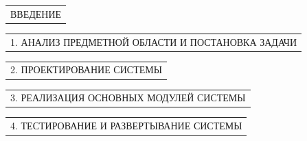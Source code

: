 \documentclass[12pt, А4, twoside]{article}
\begin{document}
\begin{FlushLeft}
    \vspace{-0.1 cm}

    \begin{tabular}{p{17.25cm}}
        \hspace{0.3cm} \textsf{ВВЕДЕНИЕ} \vspace{0pt} \hline \\
    \end{tabular}

    \vspace{-0.1 cm}

    \begin{tabular}{p{17.25cm}}
        \hspace{0.3cm} \textsf{1. АНАЛИЗ ПРЕДМЕТНОЙ ОБЛАСТИ И ПОСТАНОВКА ЗАДАЧИ} \vspace{0pt} \hline \\
    \end{tabular}



    \vspace{-0.1 cm}

    \begin{tabular}{p{17.25cm}}
        \hspace{0.3cm} \textsf{2. ПРОЕКТИРОВАНИЕ СИСТЕМЫ} \vspace{0.03cm} \hline \\
    \end{tabular}

    \vspace{-0.1 cm}

    \begin{tabular}{p{17.25cm}}
        \hspace{0.3cm} \textsf{3. РЕАЛИЗАЦИЯ ОСНОВНЫХ МОДУЛЕЙ СИСТЕМЫ} \vspace{-0.06cm} \hline \\
    \end{tabular}

    \vspace{-0.1 cm}

    \begin{tabular}{p{17.25cm}}
        \hspace{0.3cm} \textsf{4. ТЕСТИРОВАНИЕ И РАЗВЕРТЫВАНИЕ СИСТЕМЫ} \vspace{0pt} \hline \\
    \end{tabular}


\end{FlushLeft}
\end{document}
